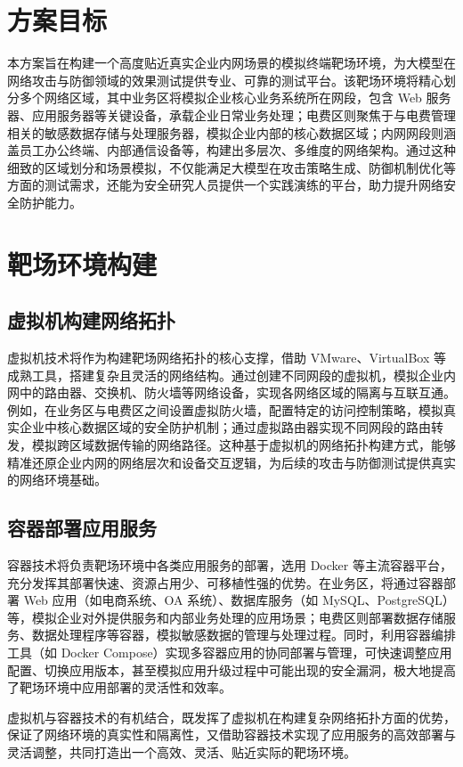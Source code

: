 \documentclass[lang=cn,10pt]{elegantbook}
\begin{document}
\section{方案目标}
本方案旨在构建一个高度贴近真实企业内网场景的模拟终端靶场环境，为大模型在网络攻击与防御领域的效果测试提供专业、可靠的测试平台。该靶场环境将精心划分多个网络区域，其中业务区将模拟企业核心业务系统所在网段，包含 Web 服务器、应用服务器等关键设备，承载企业日常业务处理；电费区则聚焦于与电费管理相关的敏感数据存储与处理服务器，模拟企业内部的核心数据区域；内网网段则涵盖员工办公终端、内部通信设备等，构建出多层次、多维度的网络架构。通过这种细致的区域划分和场景模拟，不仅能满足大模型在攻击策略生成、防御机制优化等方面的测试需求，还能为安全研究人员提供一个实践演练的平台，助力提升网络安全防护能力。

\section{靶场环境构建}
\subsection{虚拟机构建网络拓扑}
虚拟机技术将作为构建靶场网络拓扑的核心支撑，借助 VMware、VirtualBox 等成熟工具，搭建复杂且灵活的网络结构。通过创建不同网段的虚拟机，模拟企业内网中的路由器、交换机、防火墙等网络设备，实现各网络区域的隔离与互联互通。例如，在业务区与电费区之间设置虚拟防火墙，配置特定的访问控制策略，模拟真实企业中核心数据区域的安全防护机制；通过虚拟路由器实现不同网段的路由转发，模拟跨区域数据传输的网络路径。这种基于虚拟机的网络拓扑构建方式，能够精准还原企业内网的网络层次和设备交互逻辑，为后续的攻击与防御测试提供真实的网络环境基础。

\subsection{容器部署应用服务}
容器技术将负责靶场环境中各类应用服务的部署，选用 Docker 等主流容器平台，充分发挥其部署快速、资源占用少、可移植性强的优势。在业务区，将通过容器部署 Web 应用（如电商系统、OA 系统）、数据库服务（如 MySQL、PostgreSQL）等，模拟企业对外提供服务和内部业务处理的应用场景；电费区则部署数据存储服务、数据处理程序等容器，模拟敏感数据的管理与处理过程。同时，利用容器编排工具（如 Docker Compose）实现多容器应用的协同部署与管理，可快速调整应用配置、切换应用版本，甚至模拟应用升级过程中可能出现的安全漏洞，极大地提高了靶场环境中应用部署的灵活性和效率。​

虚拟机与容器技术的有机结合，既发挥了虚拟机在构建复杂网络拓扑方面的优势，保证了网络环境的真实性和隔离性，又借助容器技术实现了应用服务的高效部署与灵活调整，共同打造出一个高效、灵活、贴近实际的靶场环境。​
\end{document}
